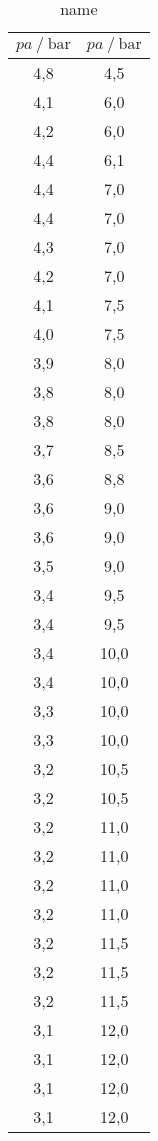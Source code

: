 \begin{table}[H] 
   \centering 
   \caption{name} 
   \label{tab:name} 
   \begin{tabular} { c c } 
 \toprule 
 {$pa\:/\: \mathrm{bar}$} & {$pa\:/\: \mathrm{bar}$} \\ 
    \midrule 
    4,8 & 4,5 \\ 
    4,1 & 6,0 \\ 
    4,2 & 6,0 \\ 
    4,4 & 6,1 \\ 
    4,4 & 7,0 \\ 
    4,4 & 7,0 \\ 
    4,3 & 7,0 \\ 
    4,2 & 7,0 \\ 
    4,1 & 7,5 \\ 
    4,0 & 7,5 \\ 
    3,9 & 8,0 \\ 
    3,8 & 8,0 \\ 
    3,8 & 8,0 \\ 
    3,7 & 8,5 \\ 
    3,6 & 8,8 \\ 
    3,6 & 9,0 \\ 
    3,6 & 9,0 \\ 
    3,5 & 9,0 \\ 
    3,4 & 9,5 \\ 
    3,4 & 9,5 \\ 
    3,4 & 10,0 \\ 
    3,4 & 10,0 \\ 
    3,3 & 10,0 \\ 
    3,3 & 10,0 \\ 
    3,2 & 10,5 \\ 
    3,2 & 10,5 \\ 
    3,2 & 11,0 \\ 
    3,2 & 11,0 \\ 
    3,2 & 11,0 \\ 
    3,2 & 11,0 \\ 
    3,2 & 11,5 \\ 
    3,2 & 11,5 \\ 
    3,2 & 11,5 \\ 
    3,1 & 12,0 \\ 
    3,1 & 12,0 \\ 
    3,1 & 12,0 \\ 
    3,1 & 12,0 \\ 
    \bottomrule 
  \end{tabular}
\end{table}
